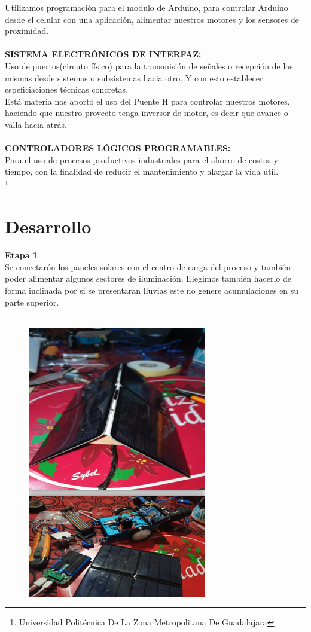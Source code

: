 \documentclass[11pt,a4paper]{article}
\begin{document}
Utilizamos programación para el modulo de Arduino, para controlar Arduino desde el celular con una aplicación, alimentar nuestros motores y los sensores de proximidad.\\\\
\textbf{SISTEMA ELECTRÓNICOS DE INTERFAZ:}\\ Uso de puertos(circuto físico) para la transmisión de señales o recepción de las mismas desde sistemas o subsistemas hacia otro. Y con esto establecer espeficiaciones técnicas concretas.\\
Está materia nos aportó el uso del Puente H para controlar nuestros motores, haciendo que nuestro proyecto tenga inversor de motor, es decir que avance o valla hacia atrás. \\\\
\textbf{CONTROLADORES LÓGICOS PROGRAMABLES:}\\ Para el uso de procesos productivos industriales para el ahorro de costos y tiempo, con la finalidad de reducir el mantenimiento y alargar la vida útil.\\

 \footnote{Universidad Politécnica De La Zona Metropolitana De Guadalajara} 
\newpage
\section{Desarrollo}
\textbf{Etapa 1}\\
Se conectarón los paneles solares con el centro de carga del proceso y también poder alimentar algunos sectores de iluminación.
Elegimos también hacerlo de forma inclinada por si se presentaran lluvias este no genere acumulaciones en su parte superior.\\\\
\begin{figure}[hbtp]
\centering
\includegraphics[scale=0.6]{Pictures/02.png}
\end{figure} 
\end{document}
